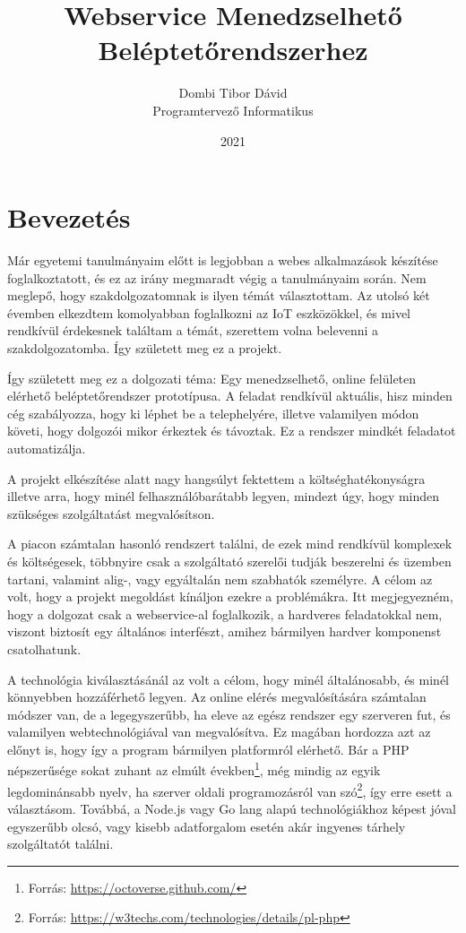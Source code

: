 \documentclass[a4paper,12pt]{thesis-ekf}
\theoremstyle{definition}
\begin{document}
	\title{Webservice Menedzselhető Beléptetőrendszerhez}
	\author{Dombi Tibor Dávid\\Programtervező Informatikus}
	\date{2021}
	\maketitle
	\tableofcontents
	
	\chapter*{Bevezetés}\label{ch-ThesisIntro}
	Már egyetemi tanulmányaim előtt is legjobban a webes alkalmazások készítése foglalkoztatott, és ez az irány megmaradt végig a tanulmányaim során. Nem meglepő, hogy szakdolgozatomnak is ilyen témát választottam.
	Az utolsó két évemben elkezdtem komolyabban foglalkozni az IoT eszközökkel, és mivel rendkívül érdekesnek találtam a témát, szerettem volna belevenni a szakdolgozatomba. Így született meg ez a projekt.
	
	Így született meg ez a dolgozati téma: Egy menedzselhető, online felületen elérhető beléptetőrendszer prototípusa. A feladat rendkívül aktuális, hisz minden cég szabályozza, hogy ki léphet be a telephelyére, illetve valamilyen módon követi, hogy dolgozói mikor érkeztek és távoztak. Ez a rendszer mindkét feladatot automatizálja.
	
	A projekt elkészítése alatt nagy hangsúlyt fektettem a költséghatékonyságra illetve arra, hogy minél felhasználóbarátabb legyen, mindezt úgy, hogy minden szükséges szolgáltatást megvalósítson.
	
	A piacon számtalan hasonló rendszert találni, de ezek mind rendkívül komplexek és költségesek, többnyire csak a szolgáltató szerelői tudják beszerelni és üzemben tartani, valamint alig-, vagy egyáltalán nem szabhatók személyre. A célom az volt, hogy a projekt megoldást kínáljon ezekre a problémákra. Itt megjegyezném, hogy a dolgozat csak a webservice-al foglalkozik, a hardveres feladatokkal nem, viszont biztosít egy általános interfészt, amihez bármilyen hardver komponenst csatolhatunk.
	
	A technológia kiválasztásánál az volt a célom, hogy minél általánosabb, és minél könnyebben hozzáférhető legyen. Az online elérés megvalósítására számtalan módszer van, de a legegyszerűbb, ha eleve az egész rendszer egy szerveren fut, és valamilyen webtechnológiával van megvalósítva. Ez magában hordozza azt az előnyt is, hogy így a program bármilyen platformról elérhető. Bár a PHP népszerűsége sokat zuhant az elmúlt években\footnote{Forrás: \url{https://octoverse.github.com/}}, még mindig az egyik legdominánsabb nyelv, ha szerver oldali programozásról van szó\footnote{Forrás: \url{https://w3techs.com/technologies/details/pl-php}}, így erre esett a választásom. Továbbá, a Node.js vagy Go lang alapú technológiákhoz képest jóval egyszerűbb olcsó, vagy kisebb adatforgalom esetén akár ingyenes tárhely szolgáltatót találni.
	
\end{document}
